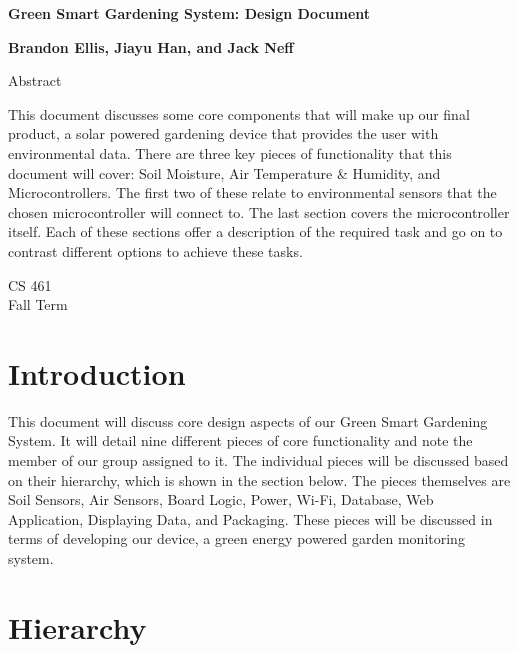 \documentclass[IEEEtran,letterpaper,10pt,titlepage,fleqn,draftclsnofoot,onecolumn]{article}
\begin{document}
\begin{titlepage}
  \begin{center}
    \vspace{1cm}
    
    \huge
    \textbf{Green Smart Gardening System: Design Document}
    
    \vspace{1.5cm}
    
    \large
        \textbf{Brandon Ellis, Jiayu Han, and Jack Neff}
    
    \vspace{5cm}
    
    Abstract
    
    \normalsize
    This document discusses some core components that will make up our final product, a solar powered gardening device that provides the user with environmental data. There are three key pieces of functionality that this document will cover: Soil Moisture, Air Temperature \& Humidity, and Microcontrollers. The first two of these relate to environmental sensors that the chosen microcontroller will connect to. The last section covers the microcontroller itself. Each of these sections offer a description of the required task and go on to contrast different options to achieve these tasks.
    
    \vfill
    
    \large
        CS 461\\
        Fall Term\\
    \end{center}
\end{titlepage}

\section{Introduction}

This document will discuss core design aspects of our Green Smart Gardening System. It will detail nine different pieces of core functionality and note the member of our group assigned to it. The individual pieces will be discussed based on their hierarchy, which is shown in the section below. The pieces themselves are Soil Sensors, Air Sensors, Board Logic, Power, Wi-Fi, Database, Web Application, Displaying Data, and Packaging. 	These pieces will be discussed in terms of developing our device, a green energy powered garden monitoring system.

\section{Hierarchy}
\end{document}
